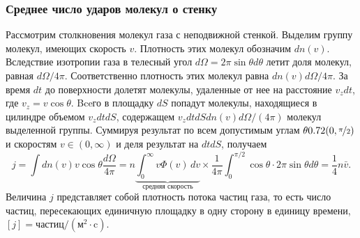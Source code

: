 \subsubsection*{Среднее число ударов молекул о стенку}
Рассмотрим столкновения молекул газа с неподвижной стенкой. Выделим группу молекул, имеющих скорость $v$. Плотность этих молекул обозначим $d n(v)$. Вследствие изотропии газа в телесный угол $d \Omega=2 \pi \sin \theta d \theta$ летит доля молекул, равная $d \Omega / 4 \pi$. Соответственно плотность этих молекул равна $dn(v) d \Omega / 4 \pi$. За время $dt$ до поверхности долетят молекулы, удаленные от нее на расстояние $v_z d t$, где $v_z=v \cos \theta$. Bceго в площадку $d S$ попадут молекулы, находящиеся в цилиндре объемом $v_z d t d S$, содержащем $v_z d t d S d n(v) d \Omega /(4 \pi)$ молекул выделенной группы. Суммируя результат по всем допустимым углам $\theta \in (0, \nicefrac{\pi}{2})$ и скоростям $v \in (0, \infty)$ и деля результат на $d t d S$, получаем
\begin{equation}
j=\int d n(v) v \cos \theta \frac{d \Omega}{4 \pi}=n \underbrace{\int_0^{\infty} v \Phi(v) \, d v}_{\text{средняя скорость}} \times \frac{1}{4 \pi} \int_0^{\pi / 2} \cos \theta \cdot 2 \pi \sin \theta d \theta=\frac{1}{4} n \bar{v} .
\label{eq:mean-count-mxwl}
\end{equation}
Величина $j$ представляет собой плотность потока частиц газа, то есть число частиц, пересекающих единичную площадку в одну сторону в единицу времени, $[j]= \text{частиц}/\left(\text{м}^2 \cdot \text{c}\right)$.

